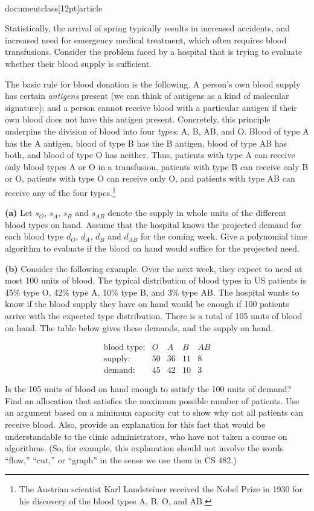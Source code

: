 \\documentclass[12pt]{article}
\begin{document}
\begin{enumerate}
Statistically,
the arrival of spring typically results in increased accidents, and
increased need for emergency medical treatment, which often requires
blood transfusions.  Consider the problem faced by a hospital
that is trying to evaluate whether their blood supply is sufficient.

The basic rule for blood donation is the following.
A person's own blood supply has certain {\em antigens} present
(we can think of antigens as a kind of molecular signature);
and a person cannot receive blood with a particular antigen
if their own blood does not have this antigen present.
Concretely, this principle underpins the division
of blood into four {\em types}: A, B, AB, and O.
Blood of type A has the A antigen, blood of type B has the B antigen,
blood of type AB has both, and blood of type O has neither.
Thus, patients with type A can receive only blood types
A or O in a transfusion, patients with type B can receive only
B or O, patients with type O can receive only O,
and patients with type AB can receive any of the
four types.\footnote{The Austrian scientist Karl
Landsteiner received the Nobel Prize in 1930 for
his discovery of the blood types A, B, O, and AB. }

{\bf (a)} Let $s_O$, $s_A$, $s_B$ and $s_{AB}$ denote the supply in whole
units of the  different blood types on hand. Assume that the hospital knows
the projected demand for each blood type $d_O$, $d_A$, $d_B$ and $d_{AB}$
for the coming week.
Give a polynomial time algorithm to evaluate if the
blood on hand would suffice for the projected need.

{\bf (b)} Consider the following example. Over the next week, they expect to
need at most 100 units of blood. The typical distribution of blood types
in US patients is 45\% type O, 42\% type A, 10\% type B, and 3\% type AB.
The hospital wants to know if the blood supply they have on hand would
be enough if 100 patients arrive with the expected type distribution.
There is a total of 105 units of blood on hand.
The table below gives these demands, and the supply on hand.

$$\begin{array}{lcccc}
\mbox{blood type:} & O  & A  & B  & AB \\
\mbox{supply:}     & 50 & 36 & 11 & 8 \\
\mbox{demand:}     & 45 & 42 & 10 & 3
\end{array}$$

Is the 105 units of blood on hand enough to satisfy the 100 units of demand?
Find an allocation that satisfies the maximum possible number of patients.
Use an argument based on a
minimum capacity cut to show why not all patients can receive blood.
Also, provide an explanation for this fact
that would be understandable to the clinic administrators, who
have not taken a course on algorithms.
(So, for example, this explanation should not involve the words
``flow,'' ``cut,'' or ``graph'' in the sense we use them in CS 482.)


\end{enumerate}
\end{document}
